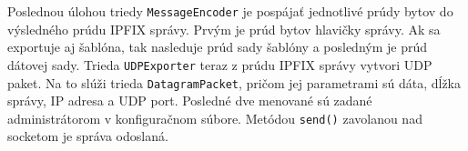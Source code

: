Poslednou úlohou triedy \verb|MessageEncoder| je pospájať jednotlivé prúdy bytov do výsledného prúdu IPFIX 
správy. Prvým je prúd bytov hlavičky správy. Ak sa exportuje aj šablóna, tak nasleduje prúd sady šablóny 
a posledným je prúd dátovej sady. Trieda \verb|UDPExporter| teraz z prúdu IPFIX správy vytvori 
UDP paket. Na to slúži trieda \verb|DatagramPacket|, pričom jej parametrami sú dáta, dĺžka správy, 
IP adresa a UDP port. Posledné dve menované sú zadané administrátorom v konfiguračnom súbore. Metódou 
\verb|send()| zavolanou nad socketom je správa odoslaná.






